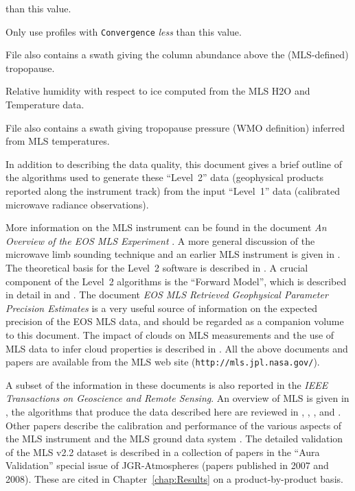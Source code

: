 \documentclass[11pt,draft]{report}
\begin{document}
\begin{table}
{\begin{tablenotes}
    than this value.
  \item[\mbox{[2]}] Only use profiles with \texttt{Convergence} \emph{less} than this value.
  \item[\mbox{[3]}] File also contains a swath giving the column
    abundance above the (MLS-defined) tropopause.
  \item[\mbox{[4]}] Relative humidity with respect to ice computed from the
    MLS H\cs2O and Temperature data.
  \item[\mbox{[5]}] File also contains a swath giving tropopause
    pressure (WMO definition) inferred from MLS temperatures.
  \end{tablenotes}}

\end{table}


In addition to describing the data quality, this document gives a brief
outline of the algorithms used to generate these ``Level~2'' data
(geophysical products reported along the instrument track) from the
input ``Level~1'' data (calibrated microwave radiance observations).

More information on the MLS instrument can be found in the document
\emph{An Overview of the EOS MLS Experiment} \citep{EOSMLSOverview}.  A
more general discussion of the microwave limb sounding technique and an
earlier MLS instrument is given in \citet{WatersEtal99}.  The
theoretical basis for the Level~2 software is described in
\citet{EOSMLSL2ATBD}.  A crucial component of the Level~2 algorithms is
the ``Forward Model'', which is described in detail in
\citet{EOSMLSFWMATBD} and \citet{EOSMLSPolarizedFWMATBD}.  The document
\emph{EOS MLS Retrieved Geophysical Parameter Precision Estimates}
\citep{EOSMLSPrecision} is a very useful source of information on the
expected precision of the EOS MLS data, and should be regarded as a
companion volume to this document.  The impact of clouds on MLS
measurements and the use of MLS data to infer cloud properties is
described in \cite{EOSMLSCloudATBD}.  All the above documents and papers
are available from the MLS web site (\texttt{http://mls.jpl.nasa.gov/}).

A subset of the information in these documents is also reported in the
\emph{IEEE Transactions on Geoscience and Remote Sensing}.  An overview
of MLS is given in \cite{WatersEtal06}, the algorithms that produce the
data described here are reviewed in \citet{LiveseyEtal06},
\citet{ReadEtal06}, \citet{SchwartzEtal06}, and \citet{WuEtal06}\@.
Other papers describe the calibration and performance of the various
aspects of the MLS instrument
\citep{JarnotEtal06,Pickett06,CofieldAndStek06} and the MLS ground data
system \citep{CuddyEtal06}.  The detailed validation of the MLS v2.2
dataset is described in a collection of papers in the ``Aura
Validation'' special issue of JGR-Atmospheres (papers published in 2007
and 2008).  These are cited in Chapter~\ref{chap:Results} on a
product-by-product basis.
\end{document}
